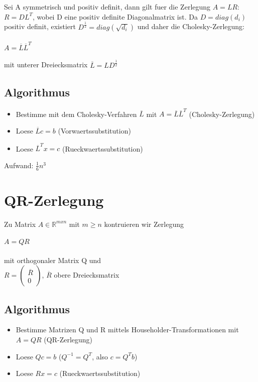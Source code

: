 \documentclass[a4paper]{scrreprt}
\begin{document}
Sei A symmetrisch und positiv definit, dann gilt fuer die Zerlegung $A = LR$: $R = DL^T$, wobei D eine positiv definite Diagonalmatrix ist. Da $D = diag(d_i)$ positiv definit, existiert $D^\frac{1}{2} = diag(\sqrt{d_i})$ und daher die Cholesky-Zerlegung:\\\\
$A = \overline{L}\overline{L}^T$\\\\
mit unterer Dreiecksmatrix $\overline{L} = LD^\frac{1}{2}$

\subsection{Algorithmus}
\begin{itemize}
	\item Bestimme mit dem Cholesky-Verfahren $\overline{L}$ mit $A = \overline{L}\overline{L}^T$ (Cholesky-Zerlegung)
	\item Loese $\overline{L}c = b$ (Vorwaertssubstitution)
	\item Loese $\overline{L}^Tx = c$ (Rueckwaertssubstitution)
\end{itemize}

Aufwand: $\frac{1}{6}n^3$

\section{QR-Zerlegung}

Zu Matrix $A \in \mathbb{R}^{mxn}$ mit $m \geq n$ kontruieren wir Zerlegung\\\\
$A = QR$\\\\
mit orthogonaler Matrix Q und\\
$R = \begin{pmatrix}\overline{R}\\0\end{pmatrix}$, $\overline{R}$ obere Dreiecksmatrix

\subsection{Algorithmus}
\begin{itemize}
	\item Bestimme Matrizen Q und R mittels Householder-Transformationen mit $A = QR$ (QR-Zerlegung)
	\item Loese $Qc = b$ ($Q^{-1} = Q^T$, also $c = Q^Tb$)
	\item Loese $Rx = c$ (Rueckwaertssubstitution)
\end{itemize}
\end{document}
